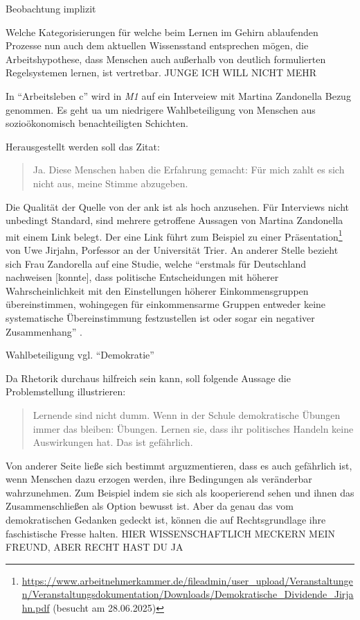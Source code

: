 Beobachtung \autocite[72-81]{Kiesel2012}
implizit 

Welche Kategorisierungen für welche beim Lernen im Gehirn ablaufenden Prozesse nun auch dem aktuellen Wissensstand entsprechen mögen, die Arbeitshypothese, dass Menschen auch außerhalb von deutlich formulierten Regelsystemen lernen, ist vertretbar. 
JUNGE ICH WILL NICHT MEHR



In \enquote{Arbeitsleben c} wird in \emph{M1} auf ein Interveiew mit Martina Zandonella \autocite{Zandonella.2024} Bezug genommen. Es geht \gls{ua} um niedrigere Wahlbeteiligung von Menschen aus sozioökonomisch benachteiligten Schichten.

Herausgestellt werden soll das Zitat:
\begin{quote}
    Ja. Diese Menschen haben die Erfahrung gemacht: Für mich zahlt es sich nicht aus, meine Stimme abzugeben.   
\end{quote}

Die Qualität der Quelle von der \gls{ank} ist als hoch anzusehen. Für Interviews nicht unbedingt Standard, sind mehrere getroffene Aussagen von Martina Zandonella mit einem Link belegt. Der eine Link führt zum Beispiel zu einer Präsentation\footnote{
    \url{https://www.arbeitnehmerkammer.de/fileadmin/user_upload/Veranstaltungen/Veranstaltungsdokumentation/Downloads/Demokratische_Dividende_Jirjahn.pdf} (besucht am 28.06.2025)
} von Uwe Jirjahn, Porfessor an der Universität Trier. An anderer Stelle bezieht sich Frau Zandorella auf eine Studie, welche 
\enquote{erstmals für Deutschland nachweisen [konnte], dass politische Entscheidungen mit höherer Wahrscheinlichkeit mit den Einstellungen höherer Einkommensgruppen übereinstimmen, wohingegen für einkommensarme Gruppen entweder keine systematische Übereinstimmung festzustellen ist oder sogar ein negativer Zusammenhang} \autocite[177]{Elsasser.2017}.


Wahlbeteiligung vgl. \enquote{Demokratie}

Da Rhetorik durchaus hilfreich sein kann, soll folgende Aussage die Problemstellung illustrieren:
\begin{quote}
    Lernende sind nicht dumm. Wenn in der Schule demokratische Übungen immer das bleiben: Übungen. Lernen sie, dass ihr politisches Handeln keine Auswirkungen hat. Das ist gefährlich.
\end{quote}

Von anderer Seite ließe sich bestimmt arguzmentieren, dass es auch gefährlich ist, wenn Menschen dazu erzogen werden, ihre Bedingungen als veränderbar wahrzunehmen. Zum Beispiel indem sie sich als kooperierend sehen und ihnen das Zusammenschließen als Option bewusst ist.
Aber da genau das vom demokratischen Gedanken gedeckt ist, können die auf Rechtsgrundlage ihre faschistische Fresse halten. HIER WISSENSCHAFTLICH MECKERN MEIN FREUND, ABER RECHT HAST DU JA



